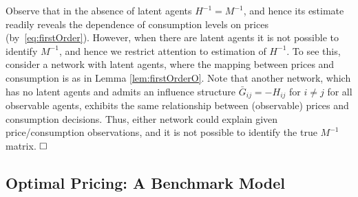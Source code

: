 \documentclass[opre,nonblindrev]{informs3} %
\begin{document}
\begin{remark}
Observe that in the absence of latent agents $H^{-1}=M^{-1}$, and hence its estimate readily reveals  the dependence of consumption levels on prices (by~\eqref{eq:firstOrder}).
However, when there are latent agents
it is not possible to identify   $M^{-1}$, and hence we restrict attention to estimation of $H^{-1}$.
To see this,
consider a network with latent agents, where
the mapping between prices and consumption is as in Lemma \ref{lem:firstOrderO}.
Note that
another network, which has no latent agents and admits an
influence structure $\bar{G}_{ij}=-H_{ij}$ for $i\neq j$ for all observable agents,
exhibits the same relationship between (observable) prices and consumption decisions.
Thus, either network could explain given price/consumption observations, and it is not possible to identify the true $M^{-1}$ matrix. $\hfill\square$
\end{remark}
 

\subsection{Optimal Pricing: A Benchmark Model} \label{subse:pricing}
\end{document}
